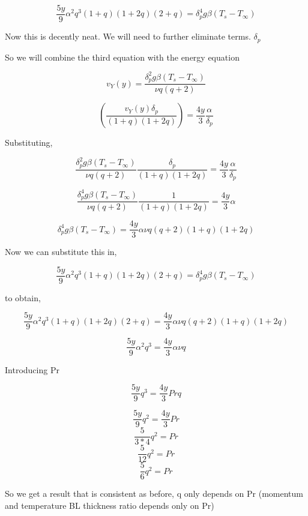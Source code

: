 \documentclass[11pt]{article}
\begin{document}
$$\frac{5 y}{9} \alpha^2 q^3 (1 + q)(1+2q)(2+q) =  \delta_p^4 g\beta (T_s - T_\infty) $$

Now this is decently neat. We will need to further eliminate terms. $\delta_p$

So we will combine the third equation with the energy equation

$$    v_Y (y)   =  \frac{\delta_p^2 g\beta (T_s -T_\infty)}{\nu q (q+2)} $$

$$   ( \frac{ v_Y (y) \delta_p}{(1 + q)(1+2q)}  ) = \frac{4y}{3} \frac{\alpha}{\delta_p}$$

Substituting,

$$  \frac{\delta_p^2 g\beta (T_s -T_\infty)}{\nu q (q+2)}  \frac{ \delta_p}{(1 + q)(1+2q)}   = \frac{4y}{3} \frac{\alpha}{\delta_p}$$


$$  \frac{\delta_p^4 g\beta (T_s -T_\infty)}{\nu q (q+2)}  \frac{1}{(1 + q)(1+2q)}   = \frac{4y}{3} \alpha $$

$$\delta_p^4 g\beta (T_s -T_\infty) =\frac{4y}{3} \alpha \nu q (q+2)(1 + q)(1+2q) $$

Now we can substitute this in,

$$\frac{5 y}{9} \alpha^2 q^3 (1 + q)(1+2q)(2+q) =  \delta_p^4 g\beta (T_s - T_\infty) $$

to obtain,

$$\frac{5 y}{9} \alpha^2 q^3 (1 + q)(1+2q)(2+q) =  \frac{4y}{3} \alpha \nu q (q+2)(1 + q)(1+2q) $$

$$\frac{5 y}{9} \alpha^2 q^3  =  \frac{4y}{3} \alpha \nu q  $$

Introducing Pr

$$\frac{5 y}{9}  q^3  =  \frac{4y}{3} Pr q  $$

$$\frac{5 y}{9}  q^2  =  \frac{4y}{3} Pr  $$
$$\frac{5}{3*4}  q^2 =   Pr   $$
$$\frac{5}{12}  q^2 =   Pr  $$
$$\frac{5}{6} q^2 =   Pr  $$

So we get a result that is consistent as before, q only depends on Pr (momentum and temperature BL thickness ratio depends only on Pr)


%
%
%
%
%
%
%
%
%
%
%
%
\end{document}
